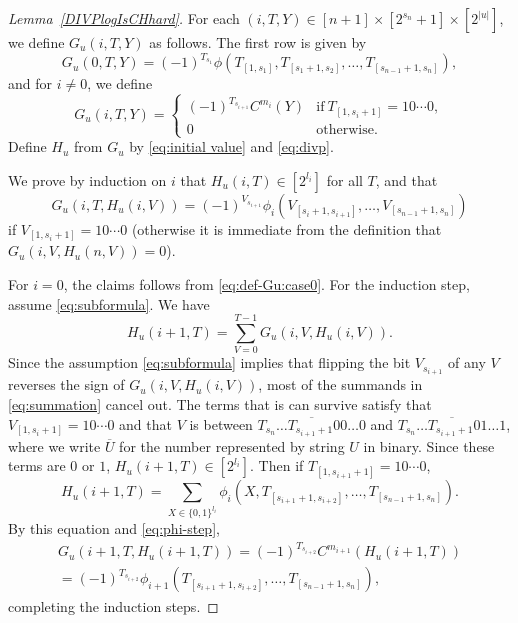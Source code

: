 \begin{proof}[Lemma~\ref{DIVPlogIsCHhard}]
For each $(i, T, Y) \in [n+1] \times [2^{s_n}+1] \times [2^{|u|}]$,
we define $G_u (i, T, Y)$ as follows.
The first row is given by
 \begin{equation}\label{eq:def-Gu:case0}
  G_u(0,T,Y) = 
   (-1)^{T_{s_1}}\phi(T_{[1,s_1]}, T_{[s_1+1,s_2]},
    \dots, T_{[s_{n-1}+1,s_n]}), 
 \end{equation}
and for $i \neq 0$, we define 
 \begin{equation} 
  G_u(i,T,Y) = 
   \begin{cases}
    (-1)^{T_{s_{i+1}}} C^{m_i}(Y) 
    & \text{if} \ T_{[1,s_i+1]} = 10 \cdots 0, \\
    0 & \text{otherwise}.
   \end{cases} 
 \end{equation}
Define $H_u$ from $G_u$ by \eqref{eq:initial value} and \eqref{eq:divp}.

We prove by induction on $i$ that $H_u(i, T) \in [2^{l_i}]$ for all $T$, and that 
 \begin{equation} \label{eq:subformula}
  G_u(i,T,H_u(i,V)) = (-1)^{V_{s_{i+1}}} 
   \phi_i(V_{[s_i+1, s_{i+1}]}, \dots, V_{[s_{n-1}+1, s_n]})
 \end{equation}
if $V_{[1, s_i +1]} = 10 \cdots 0$ 
(otherwise it is immediate from the definition that $G_u(i, V, H_u(n, V)) = 0$).

For $i=0$, the claims follows from \eqref{eq:def-Gu:case0}.
For the induction step, assume \eqref{eq:subformula}. 
We have
 \begin{equation} \label{eq:summation}
  H_u(i+1, T) 
  = \sum_{V = 0}^{T-1} G_u(i, V, H_u(i, V)).
 \end{equation}
Since the assumption \eqref{eq:subformula} implies that flipping the bit $V_{s_{i+1}}$ of
any $V$ reverses the sign of $G_u(i, V, H_u(i, V))$,
most of the summands in \eqref{eq:summation} cancel out.
The terms that is can survive satisfy that $V_{[1, s_i+1]} = 10 \cdots 0$ and
that $V$ is between $\overline{T_{s_n} \dots T_{s_{i+1}+1} 00 \dots 0}$ and 
$\overline{T_{s_n} \dots T_{s_{i+1}+1} 01 \dots 1}$,
where we write $\overline U$ for the number represented by string $U$ in binary.
Since these terms are $0$ or $1$, $H_u(i+1, T) \in [2^{l_i}]$.
Then if $T_{[1,s_{i+1}+1]} = 10 \cdots 0$,
 \begin{equation}
  H_u(i+1, T) = \sum_{X \in \{0,1\}^{l_i}}
  \phi_i(X, T_{[s_{i+1}+1, s_{i+2}]}, \dots, T_{[s_{n-1}+1, s_n]}).
 \end{equation}
By this equation and \eqref{eq:phi-step},
 \begin{multline}
  G_u(i+1,T,H_u(i+1,T)) 
  = (-1)^{T_{s_{i+2}}} C^{m_{i+1}} (H_u(i+1, T))
  \\
  = (-1)^{T_{s_{i+2}}} \phi_{i+1}(T_{[s_{i+1}+1, s_{i+2}]}, \dots, T_{[s_{n-1}+1, s_n]}),
 \end{multline}
completing the induction steps.


\end{proof}
